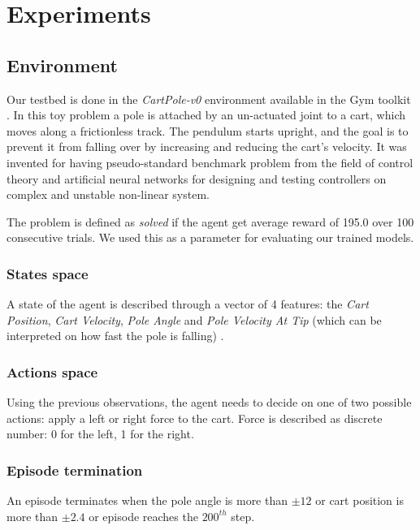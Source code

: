 \section{Experiments}

\subsection{Environment}
Our testbed is done in the \textit{CartPole-v0} environment available in the Gym toolkit \cite{Gym}.
In this toy problem a pole is attached by an un-actuated joint to a cart, which moves along a frictionless track. The pendulum starts upright, and the goal is to prevent it from falling over by increasing and reducing the cart's velocity. It was invented for having pseudo-standard benchmark problem from the field of control theory and artificial neural networks for designing and testing controllers on complex and unstable non-linear system.

The problem is defined as \textit{solved} if the agent get average reward of 195.0 over 100 consecutive trials. We used this as a parameter for evaluating our trained models.
 
\subsubsection{States space}
A state of the agent is described through a vector of 4 features: the  \textit{Cart Position}, \textit{Cart Velocity}, \textit{Pole Angle} and \textit{Pole Velocity At Tip} (which can be interpreted on how fast the pole is falling) .

\subsubsection{Actions space}
Using the previous observations, the agent needs to decide on one of two possible actions: apply a left or right force to the cart. Force is described as discrete number: 0 for the left, 1 for the right.




\subsubsection{Episode termination}
An episode terminates when the pole angle is more than $\pm12$ or cart position is more than $\pm2.4$ or episode reaches the $200^{th}$ step.


